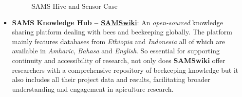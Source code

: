 \documentclass[12pt]{article}
\begin{document}
\begin{itemize}
\begin{figure}[H]
\begin{minipage}{0.45\textwidth}
				\caption{SAMS Hive and Sensor Case \cite{sams_project_material}}
				\label{fig:SAMS_HIVE}
			\end{minipage}
		\end{figure}
		\item \textbf{SAMS Knowledge Hub – \href{https://wiki.sams-project.eu/index.php/Main_Page}{\small SAMSwiki}}: An \textit{open-sourced} knowledge sharing platform dealing with bees and beekeeping globally. The platform mainly features databases from \textit{Ethiopia} and \textit{Indonesia} all of which are available in \textit{Amharic}, \textit{Bahasa} and \textit{English}. So essential for supporting continuity and accessibility of research, not only does \textbf{SAMSwiki} offer researchers with a comprehensive repository of beekeeping knowledge but it also includes all their project data and results, facilitating broader understanding and engagement in apiculture research. \vspace{0.5 cm}
		

\end{itemize}
\end{document}
